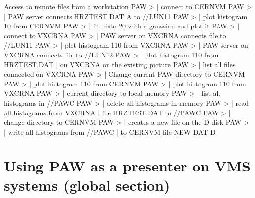 \begin{XMPt}{Access to remote files from a workstation}
PAW >                          | connect to CERNVM
PAW >                | PAW server connects HRZTEST DAT A to //LUN11
PAW >                          | plot histogram 10 from CERNVM
PAW >                         | fit histo 20 with a gaussian and plot it
PAW >                          | connect to VXCRNA
PAW >   | PAW server on VXCRNA connects file to //LUN11
PAW >                         | plot histogram 110 from VXCRNA
PAW >                | PAW server on VXCRNA connects file to //LUN12
PAW >                       | plot histogram 110 from HRZTEST.DAT
                                            | on VXCRNA on the existing picture
PAW >                           | list all files connected on VXCRNA
PAW >                          | Change current PAW directory to CERNVM
PAW >                         | plot histogram 110 from CERNVM
PAW >                | plot histogram 110 from VXCRNA
PAW >                            | current directory to local memory
PAW >                             | list all histograms in //PAWC
PAW >                         | delete all histograms in memory
PAW >                        | read all histograms from VXCRNA
                                            | file HRZTEST.DAT to //PAWC
PAW >                          | change directory to CERNVM
PAW >           | creates a new file on the D disk
PAW >                                | write all histograms from //PAWC
                                            | to CERNVM file NEW DAT D
\end{XMPt}
 
\section{Using PAW as a presenter on VMS systems (global section)}
 
